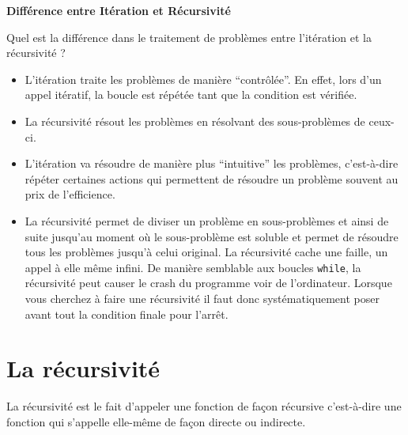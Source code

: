     \begin{Exercice}[5 minutes] \textbf{Différence entre Itération et Récursivité}
      	
      	Quel est la différence dans le traitement de problèmes entre l'itération et la récursivité ?
    
        \begin{conseil}
        
           \begin{itemize}
               \item L'itération traite les problèmes de manière ``contrôlée''. En effet, lors d'un appel itératif, la boucle est répétée tant que la condition est vérifiée.
           	\item La récursivité résout les problèmes en résolvant des sous-problèmes de ceux-ci.
           \end{itemize}
		     
        \end{conseil}
        
        \begin{solution}
        	\begin{itemize}
            \item L'itération va résoudre de manière plus ``intuitive'' les problèmes, c'est-à-dire répéter certaines actions qui permettent de résoudre un problème souvent au prix de l'efficience.
            \item La récursivité permet de diviser un problème en sous-problèmes et ainsi de suite jusqu'au moment où le sous-problème est soluble et permet de résoudre tous les problèmes jusqu'à celui original. La récursivité cache une faille, un appel à elle même infini. De manière semblable aux boucles \lstinline{while}, la récursivité peut causer le crash du programme voir de l'ordinateur. Lorsque vous cherchez à faire une récursivité il faut donc systématiquement poser avant tout la condition finale pour l'arrêt.
           \end{itemize}
        \end{solution}
    \end{Exercice}
    
    
    \section{La récursivité}
    
    La récursivité est le fait d'appeler une fonction de façon récursive c'est-à-dire une fonction qui s'appelle elle-même de façon directe ou indirecte. \\
    

